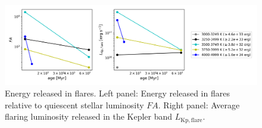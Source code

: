 \documentclass{aa}
\begin{document}

   \begin{figure}
            \includegraphics[width=\hsize]{pics/Teffbin_age_mass_AM/FA_Lflare_energy_2019_03_22_15.png}
              \caption{Energy released in flares. Left panel: Energy released in flares relative to quiescent stellar luminosity $FA$. Right panel: Average flaring luminosity released in the Kepler band $L_\mathrm{Kp,flare}$.}
               \label{agemass_FA_Lflare}
   \end{figure}
\end{document}
